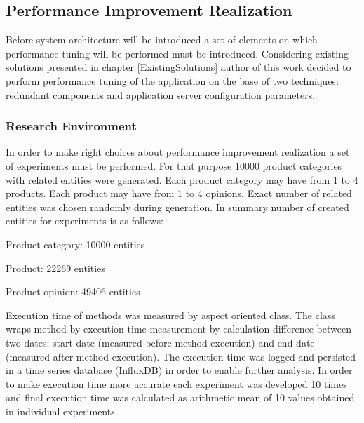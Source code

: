 \documentclass[10pt,a4paper]{article}
\let\tempone\itemize
\let\temptwo\enditemize
\renewenvironment{itemize}{\tempone\addtolength{\itemsep}{-0.4\baselineskip}}{\temptwo}
\begin{document}
\subsection{Performance Improvement Realization} \label{realization}

Before system architecture will be introduced a set of elements on which performance tuning will be performed must be introduced.  
Considering existing solutions presented in chapter \ref{ExistingSolutions} author of this work decided to perform performance tuning of the application on the base of two techniques: redundant components and application server configuration parameters. 

\subsubsection{Research Environment}

In order to make right choices about performance improvement realization a set of experiments must be performed. 
For that purpose 10000 product categories with related entities were generated. Each product category may have from 1 to 4 products. Each product may have from 1 to 4 opinions. Exact number of related entities was chosen randomly during generation. In summary number of created entities for experiments is as follows:
\begin{itemize}
\item Product category: 10000 entities
\item Product: 22269 entities
\item Product opinion: 49406 entities
\end{itemize}  

Execution time of methods was measured by aspect oriented class. The class wraps method by execution time measurement by calculation difference between two dates: start date (measured before method execution) and end date (measured after method execution). The execution time was logged and persisted in a time series database (InfluxDB) in order to enable further analysis. In order to make execution time more accurate each experiment was developed 10 times and final execution time was calculated as arithmetic mean of 10 values obtained in individual experiments. 
\end{document}
